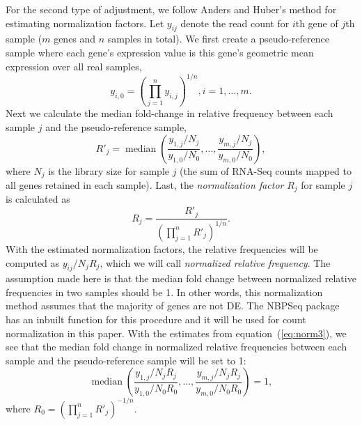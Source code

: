 \documentclass[letterpaper,12pt]{article}
\DeclareMathOperator{\median}{median}
\begin{document}
For the second type of adjustment, we follow Anders and Huber's method
\citep{anders2010differential} for 
estimating normalization factors.  Let $y_{ij}$ denote the read count
for $i$th gene of $j$th sample ($m$ genes and $n$ samples in total). We first
create a pseudo-reference sample where each gene's expression value is this
gene's geometric mean expression over all real samples,
\begin{equation}
 y_{i,0} = (\prod_{j=1}^ny_{i,j})^{1/n},  i=1, \ldots, m. 
\end{equation} 
Next we calculate the median fold-change in relative frequency between
each sample $j$ and the pseudo-reference sample,
\begin{equation}\label{eq:normfactors} 
    R'_j = \median \left(\dfrac{y_{1,j}/N_j}{y_{1,0}/N_{0}}, \ldots, \dfrac{y_{m,j}/N_j}{y_{m,0}/N_{0}}\right),
\end{equation}
where $N_j$ is the library size for sample $j$ (the sum of RNA-Seq
counts mapped to all genes retained in each sample). Last, the
\textit{normalization factor}  $R_j$ for sample $j$ is calculated as 
\begin{equation}
    \label{eq:norm3}
R_j = \dfrac{R'_j}{(\prod_{j=1}^{n}R'_j)^{1/n}}.
\end{equation}
With the estimated normalization factors, the relative frequencies will be
computed as $y_{ij}/{N_j R_j}$, which we will call {\em normalized relative
frequency}. The assumption made here is that the
median fold change between normalized relative frequencies in two samples should be 1. In
other words, this normalization method assumes that the majority of genes are
not DE. The NBPSeq package \citep{di2014package} has an inbuilt function for
this procedure and it will be used for count normalization in this paper. With
the estimates from equation~(\ref{eq:norm3}), we see that the median fold
change in normalized relative frequencies between each sample and the pseudo-reference
sample will be set to 1:
\begin{equation}
    \label{eq:medianfc}
    \median \left(\dfrac{y_{1,j}/ N_jR_j}{y_{1,0}/N_{0}R_0}, \ldots,
    \dfrac{y_{m,j}/N_j R_j}{y_{m,0}/N_{0}R_0} \right) = 1,
\end{equation}
where $R_0 = (\prod_{j=1}^{n}R'_j)^{-1/n}$.

\end{document}
